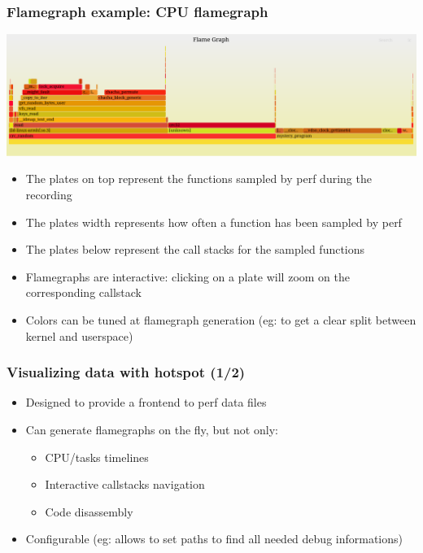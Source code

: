 \begin{frame}[fragile]
  \frametitle{Flamegraph example: CPU flamegraph}
  \center
	\includegraphics[width=1.0\textwidth]{slides/debugging-system-wide-profiling/flamegraph.png}\\
  \begin{itemize}
    \item The plates on top represent the functions sampled by perf during
      the recording
    \item The plates width represents how often a function has been
      sampled by perf
    \item The plates below represent the call stacks for the sampled functions
    \item Flamegraphs are interactive: clicking on a plate will zoom on the
      corresponding callstack
    \item Colors can be tuned at flamegraph generation (eg: to get a clear
      split between kernel and userspace)
  \end{itemize}
\end{frame}

\begin{frame}[fragile]
  \frametitle{Visualizing data with hotspot (1/2)}
  \begin{itemize}
	  \item Designed to provide a frontend to perf data files
    \item Can generate flamegraphs on the fly, but not only:
      \begin{itemize}
        \item CPU/tasks timelines
        \item Interactive callstacks navigation
        \item Code disassembly
      \end{itemize}
    \item Configurable (eg: allows to set paths to find all needed debug
      informations)
  \end{itemize}
\end{frame}

